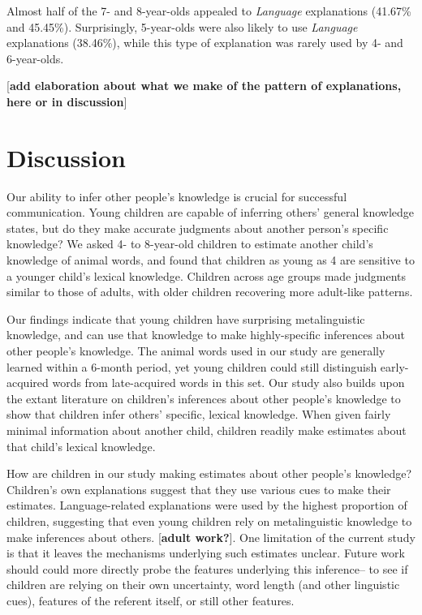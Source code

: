 \documentclass[10pt, letterpaper]{article}
\begin{document}
Almost half of the 7- and 8-year-olds appealed to \emph{Language}
explanations (41.67\% and 45.45\%). Surprisingly, 5-year-olds were also
likely to use \emph{Language} explanations (38.46\%), while this type of
explanation was rarely used by 4- and 6-year-olds.

{[}\textbf{add elaboration about what we make of the pattern of
explanations, here or in discussion}{]}

\hypertarget{discussion}{%
\section{Discussion}\label{discussion}}

Our ability to infer other people's knowledge is crucial for successful
communication. Young children are capable of inferring others' general
knowledge states, but do they make accurate judgments about another
person's specific knowledge? We asked 4- to 8-year-old children to
estimate another child's knowledge of animal words, and found that
children as young as 4 are sensitive to a younger child's lexical
knowledge. Children across age groups made judgments similar to those of
adults, with older children recovering more adult-like patterns.

Our findings indicate that young children have surprising metalinguistic
knowledge, and can use that knowledge to make highly-specific inferences
about other people's knowledge. The animal words used in our study are
generally learned within a 6-month period, yet young children could
still distinguish early-acquired words from late-acquired words in this
set. Our study also builds upon the extant literature on children's
inferences about other people's knowledge to show that children infer
others' specific, lexical knowledge. When given fairly minimal
information about another child, children readily make estimates about
that child's lexical knowledge.

How are children in our study making estimates about other people's
knowledge? Children's own explanations suggest that they use various
cues to make their estimates. Language-related explanations were used by
the highest proportion of children, suggesting that even young children
rely on metalinguistic knowledge to make inferences about others.
{[}\textbf{adult work?}{]}. One limitation of the current study is that
it leaves the mechanisms underlying such estimates unclear. Future work
should could more directly probe the features underlying this
inference-- to see if children are relying on their own uncertainty,
word length (and other linguistic cues), features of the referent
itself, or still other features.
\end{document}
